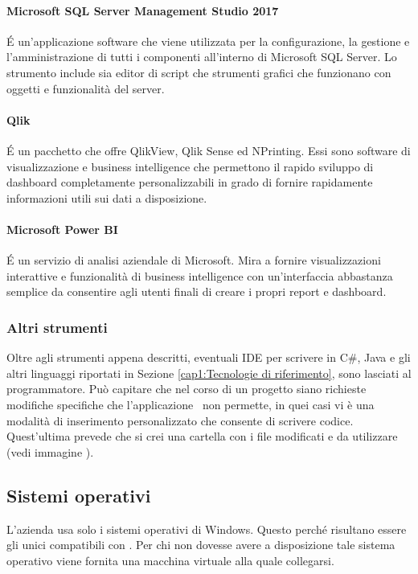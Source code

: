 \paragraph{Microsoft SQL Server Management Studio 2017} \'E un'applicazione software che viene utilizzata per la configurazione, la gestione e l'amministrazione di tutti i componenti all'interno di Microsoft SQL Server. Lo strumento include sia editor di script che strumenti grafici che funzionano con oggetti e funzionalità del server.

\paragraph{Qlik}\'E un pacchetto che offre QlikView, Qlik Sense ed NPrinting. Essi sono software di visualizzazione e business intelligence che permettono il rapido sviluppo di dashboard completamente personalizzabili in grado di fornire rapidamente informazioni utili sui dati a disposizione.

\paragraph{Microsoft Power BI}
\'E un servizio di analisi aziendale di Microsoft. Mira a fornire visualizzazioni interattive e funzionalità di business intelligence con un'interfaccia abbastanza semplice da consentire agli utenti finali di creare i propri report e dashboard.

\subsubsection*{Altri strumenti}

Oltre agli strumenti appena descritti, eventuali IDE per scrivere in C\#, Java e gli altri linguaggi riportati in Sezione \ref{cap1:Tecnologie di riferimento}, sono lasciati al programmatore. Può capitare che nel corso di un progetto siano richieste  modifiche specifiche che l'applicazione \inde\ non permette, in quei casi vi è una modalità di inserimento personalizzato che consente di scrivere codice. Quest'ultima prevede che si crei una cartella con i file modificati e da utilizzare (vedi immagine \todo).


\subsection{Sistemi operativi}
\label{cap1:Sistemi operativi}

L'azienda usa  solo i sistemi operativi di Windows. Questo perché risultano essere gli unici compatibili con \inde. Per chi non dovesse avere a disposizione tale sistema operativo viene fornita una macchina virtuale alla quale collegarsi. 


